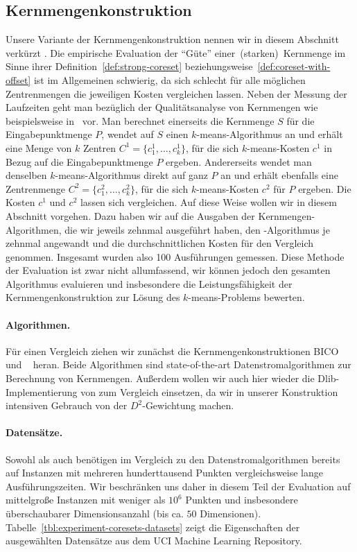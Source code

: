 \subsection{Kernmengenkonstruktion}
\label{subsection:experiment-coreset}

Unsere Variante der Kernmengenkonstruktion nennen wir in diesem Abschnitt verkürzt \CsTwo. Die empirische Evaluation
der "`Güte"' einer~(starken)~Kernmenge im Sinne ihrer Definition~\ref{def:strong-coreset}
beziehungsweise~\ref{def:coreset-with-offset} ist im Allgemeinen schwierig, da sich schlecht für alle möglichen Zentrenmengen
die jeweiligen Kosten vergleichen lassen. Neben der Messung der Laufzeiten geht man bezüglich der Qualitätsanalyse von Kernmengen
wie beispielsweise in~\cite{AckermannMRSLS12,FichtenbergerGSSS13} vor. Man berechnet einerseits die Kernmenge $S$ für die
Eingabepunktmenge $P$, wendet auf $S$ einen $k$-means-Algorithmus an und erhält eine Menge von $k$ Zentren
$C^1 = \{c_1^1, \dots, c_k^1\}$, für die sich $k$-means-Kosten $c^1$ in Bezug auf die Eingabepunktmenge $P$ ergeben.
Andererseits wendet man denselben $k$-means-Algorithmus direkt auf ganz $P$ an und erhält ebenfalls eine Zentrenmenge
$C^2 = \{c_1^2, \dots, c_k^2\}$, für die sich $k$-means-Kosten $c^2$ für $P$ ergeben. Die Kosten $c^1$ und $c^2$ lassen sich
vergleichen. Auf diese Weise wollen wir in diesem Abschnitt vorgehen. Dazu haben wir auf die Ausgaben der Kernmengen-Algorithmen,
die wir jeweils zehnmal ausgeführt haben,
den \kmpp-Algorithmus je zehnmal angewandt und die durchschnittlichen Kosten für den Vergleich
genommen. Insgesamt wurden also 100 Ausführungen gemessen.
Diese Methode der Evaluation ist zwar nicht allumfassend,
wir können jedoch den gesamten Algorithmus evaluieren und insbesondere die Leistungsfähigkeit der Kernmengenkonstruktion zur
Lösung des $k$-means-Problems bewerten.
\paragraph{Algorithmen.} Für einen Vergleich ziehen wir zunächst die Kernmengenkonstruktionen BICO~\cite{FichtenbergerGSSS13}
und \Skmpp~\cite{AckermannMRSLS12} heran. Beide Algorithmen sind state-of-the-art Datenstromalgorithmen zur Berechnung von
Kernmengen. Außerdem wollen wir auch hier wieder die Dlib-Implementierung von \kmpp{} zum Vergleich einsetzen, da wir in
unserer Konstruktion intensiven Gebrauch von der $D^2$-Gewichtung machen.
\paragraph{Datensätze.} Sowohl \kmpp{} als auch \CsTwo{} benötigen im Vergleich zu den Datenstromalgorithmen bereits auf Instanzen
mit mehreren hunderttausend Punkten vergleichsweise lange Ausführungszeiten. Wir beschränken uns daher in diesem Teil der
Evaluation auf mittelgroße Instanzen mit weniger als $10^6$ Punkten und insbesondere überschaubarer Dimensionsanzahl (bis
ca. $50$ Dimensionen). Tabelle~\ref{tbl:experiment-coresets-datasets} zeigt die Eigenschaften der ausgewählten Datensätze aus dem
UCI Machine Learning Repository.
